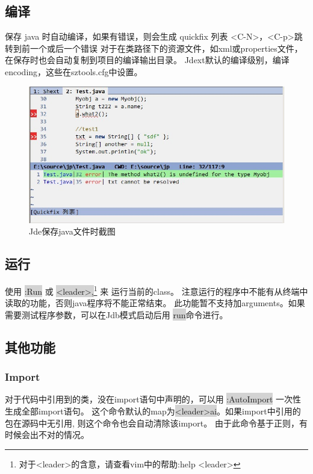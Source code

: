 \documentclass[oneside,openany]{book}
\begin{document}
\subsection{编译}
    保存 java 时自动编译，如果有错误，则会生成 quickfix 列表 <C-N>，<C-p>跳转到前一个或后一个错误 
    对于在类路径下的资源文件，如xml或properties文件，　在保存时也会自动复制到项目的编译输出目录。
    Jdext默认的编译级别，编译encoding，这些在sztools.cfg中设置。

  \begin{figure}[htbp]%
  \centering
  \includegraphics[scale=0.5]{compile.jpg}
  \caption{Jde保存java文件时截图}
  \end{figure}

\subsection{运行}
    使用 \colorbox{lightgray}{:Run} 或 \colorbox{lightgray}{<leader>,}\footnote{对于<leader>的含意，请查看vim中的帮助:help <leader>} 来 运行当前的class。
  注意运行的程序中不能有从终端中读取的功能，否则java程序将不能正常结束。
    此功能暂不支持加arguments。如果需要测试程序参数，可以在Jdb模式启动后用 \colorbox{lightgray}{run}命令进行。

\subsection{其他功能}

\subsubsection{Import}
    对于代码中引用到的类，没在import语句中声明的，可以用 \colorbox{lightgray}{:AutoImport} 一次性生成全部import语句。 
这个命令默认的map为\colorbox{lightgray}{<leader>ai}。如果import中引用的包在源码中无引用, 则这个命令也会自动清除该import。
由于此命令基于正则，有时候会出不对的情况。
\end{document}

